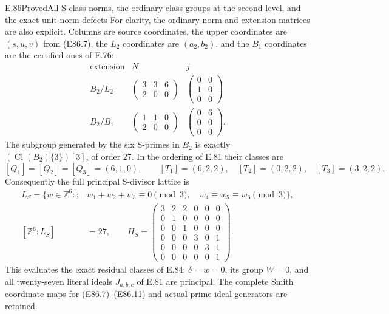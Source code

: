 \begin{statement}{E.86}{Proved}{All S-class norms, the ordinary class groups at the second level, and the exact unit-norm defects}
For clarity, the ordinary norm and extension matrices are
also explicit. Columns are source coordinates, the upper
coordinates are $(s,u,v)$ from (E86.7), the $L_2$
coordinates are $(a_2,b_2)$, and the $B_1$ coordinates
are the certified ones of E.76:
\[
 \begin{array}{c|c|c}
 \text{extension}&N&j\\ \hline
 B_2/L_2&
 \begin{pmatrix}3&3&6\\2&0&0\end{pmatrix}&
 \begin{pmatrix}0&0\\1&0\\0&0\end{pmatrix}\\[3pt]
 B_2/B_1&
 \begin{pmatrix}1&1&0\\2&0&0\end{pmatrix}&
 \begin{pmatrix}0&6\\0&0\\0&0\end{pmatrix}.
 \end{array}
 \tag{E86.9}
\]
The subgroup generated by the six S-primes in $B_2$ is
exactly $(\operatorname{Cl}(B_2)\{3\})[3]$, of order $27$.
In the ordering of E.81 their classes are
\[
 [Q_1]=[Q_2]=[Q_3]=(6,1,0),\qquad
 [T_1]=(6,2,2),\quad[T_2]=(0,2,2),\quad[T_3]=(3,2,2).
 \tag{E86.10}
\]
Consequently the full principal S-divisor lattice is
\[
 \begin{split}
 L_S=\{w\in\mathbb Z^6:;&w_1+w_2+w_3\equiv0\pmod3,\quad
                w_4\equiv w_5\equiv w_6\pmod3\},\\
 [\mathbb Z^6:L_S]&=27,\qquad
 H_S=\begin{pmatrix}
 3&2&2&0&0&0\\0&1&0&0&0&0\\0&0&1&0&0&0\\
 0&0&0&3&0&1\\0&0&0&0&3&1\\0&0&0&0&0&1
 \end{pmatrix}.
 \end{split}
 \tag{E86.11}
\]
This evaluates the exact residual classes of E.84:
$\delta=w=0$, its group $W=0$, and all twenty-seven
literal ideals $J_{a,b,c}$ of E.81 are principal.
The complete Smith coordinate maps for (E86.7)--(E86.11)
and actual prime-ideal generators are retained.


\end{statement}
